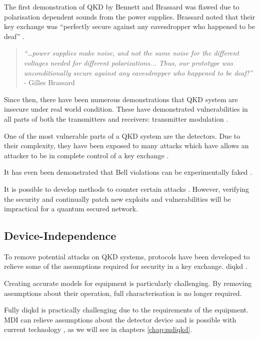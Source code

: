 The first demonstration of \ac{QKD} by Bennett and Brassard was flawed due to polarisation dependent sounds from the power supplies. Brassard noted that their key exchange was ``perfectly secure against any eavesdropper who happened to be deaf'' \cite{Brassard2005}. 

\begin{quote}
\textit{``…power supplies make noise, and not the same noise for the different voltages needed for different polarizations... Thus, our prototype was unconditionally secure against any eavesdropper who happened to be deaf!''} - Gilles Brassard \cite{Brassard2005}
\end{quote}

Since then, there have been numerous demonstrations that \ac{QKD} system are insecure under real world condition. These have demonstrated vulnerabilities in all parts of both the transmitters and receivers: transmitter modulation \cite{Gisin2006}. 

One of the most vulnerable parts of a \ac{QKD} system are the detectors. Due to their complexity, they have been exposed to many attacks which have allows an attacker to be in complete control of a key exchange \cite{Makarov2006, Gerhardt2011a, Lydersen2010a, Lydersen2010b, Lydersen2011, Sauge2011, Makarov2009, Wiechers2011}.

It has even been demonstrated that Bell violations can be experimentally faked \cite{Gerhardt2011b}.

It is possible to develop methods to counter certain attacks \cite{Lydersen2010c, Yuan2010}. However, verifying the security and continually patch new exploits and vulnerabilities will be impractical for a quantum secured network.

\subsection{Device-Independence}

To remove potential attacks on \ac{QKD} systems, protocols have been developed to relieve some of the assumptions required for security in a key exchange. \Ac{diqkd}  \cite{Acin2007, Barrett2005, Mayers1998}. 

Creating accurate models for equipment is particularly challenging. By removing assumptions about their operation, full characterisation is no longer required.

Fully \ac{diqkd} is practically challenging due to the requirements of the equipment. \ac{MDI} can relieve assumptions about the detector device and is possible with current technology \cite{mdi-qkd}, as we will see in chapters \ref{chap:mdiqkd}. 

